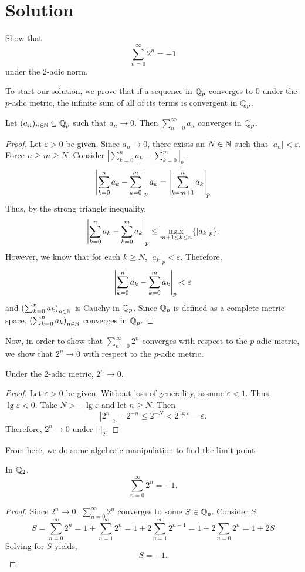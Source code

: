 \documentclass[notitlepage]{problem-solving}
\begin{document}
\section{Solution}

\begin{problem*}
	Show that
	\[
		\sum_{n=0}^\infty 2^n = -1
	\]
	under the 2-adic norm.
\end{problem*}

To start our solution, we prove that if a sequence in $\mathbb{Q}_p$ converges to 0 under the $p$-adic metric, the infinite sum of all of its terms is convergent in $\mathbb{Q}_p$.

\begin{thm}
	Let $(a_n)_{n\in\mathbb{N}}\subseteq\mathbb{Q}_p$ such that $a_n\rightarrow 0$.
	Then $\sum_{n=0}^\infty a_n$ converges in $\mathbb{Q}_p$.
\end{thm}
\begin{proof}
	Let $\varepsilon > 0$ be given.
	Since $a_n\rightarrow 0$, there exists an $N\in\mathbb{N}$ such that $|a_n|<\varepsilon$.
	Force $n\geq m\geq N$.
	Consider $|\sum_{k=0}^n a_k - \sum_{k=0}^m|_p$.
	\[
		\left| \sum_{k=0}^n a_k - \sum_{k=0}^m \right|_p a_k = \left| \sum_{k=m+1}^n a_k \right|_p
	\]
	Thus, by the strong triangle inequality,
	\[
		\left| \sum_{k=0}^n a_k - \sum_{k=0}^m a_k \right|_p \leq \max\limits_{m+1\leq k\leq n}\lbrace |a_k|_p \rbrace.
	\]
	However, we know that for each $k\geq N$, $|a_k|_p<\varepsilon$.
	Therefore,
	\[
		\left| \sum_{k=0}^n a_k - \sum_{k=0}^m a_k \right|_p < \varepsilon
	\]
	and $\left( \sum_{k=0}^n a_k \right)_{n\in\mathbb{N}}$ is Cauchy in $\mathbb{Q}_p$.
	Since $\mathbb{Q}_p$ is defined as a complete metric space, $\left( \sum_{k=0}^n a_k \right)_{n\in\mathbb{N}}$ converges in $\mathbb{Q}_p$.
\end{proof}

Now, in order to show that $\sum_{n=0}^\infty 2^n$ converges with respect to the $p$-adic metric, we show that $2^n\rightarrow 0$ with respect to the $p$-adic metric.

\begin{lemma}
	Under the 2-adic metric, $2^n\rightarrow 0$.
\end{lemma}
\begin{proof}
	Let $\varepsilon > 0$ be given.
	Without loss of generality, assume $\varepsilon < 1$.
	Thus, $\lg\varepsilon < 0$.
	Take $N > -\lg\varepsilon$ and let $n\geq N$.
	Then
	\[
		|2^n|_2 = 2^{-n} \leq 2^{-N} < 2^{\lg\varepsilon} = \varepsilon.
	\]
	Therefore, $2^n\rightarrow 0$ under $|\cdot|_2$.
\end{proof}

From here, we do some algebraic manipulation to find the limit point.

\begin{proposition}
	In $\mathbb{Q}_2$,
	\[
		\sum_{n=0}^\infty 2^n = -1.
	\]
\end{proposition}
\begin{proof}
	Since $2^n\rightarrow 0$, $\sum_{n=0}^\infty 2^n$ converges to some $S\in\mathbb{Q}_p$.
	Consider $S$.
	\[
		S= \sum_{n=0}^\infty 2^n = 1 + \sum_{n=1}^\infty 2^n = 1+ 2\sum_{n=1}^\infty 2^{n-1} = 1+ 2 \sum_{n=0} 2^n = 1+ 2S
	\]
	Solving for $S$ yields,
	\[
		S = -1.
	\]
\end{proof}

\printbibliography
\end{document}
